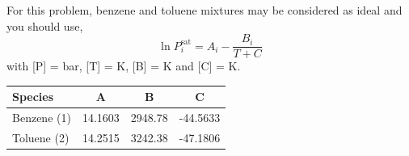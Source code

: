 \documentclass[calculator,steamtables,allquestions,datasheet,resit,solutions]{exam_newMarcus2}
\newcommand{\frc}{\displaystyle\frac}
\begin{document}
\begin{question}
\begin{enumerate}[(a)]
{ }

%
\end{enumerate}

For this problem, benzene and toluene mixtures may be considered as ideal and you should use,
\begin{displaymath}
   \ln P_{i}^{\text{sat}} = A_{i} - \frc{B_{i}}{T + C}
\end{displaymath} 
with [P] = bar, [T] = K, [B] = K and [C] = K.
    \begin{center}
       \begin{tabular}{l | c c c}   
           {\bf Species}  &   {\bf A } &  {\bf B } &  {\bf C } \\
           \hline
             Benzene (1)  &  14.1603   &  2948.78  & -44.5633  \\
             Toluene (2)  &  14.2515   &  3242.38  & -47.1806   
       \end{tabular}
    \end{center}
%
\end{question}

\clearpage
\end{document}
